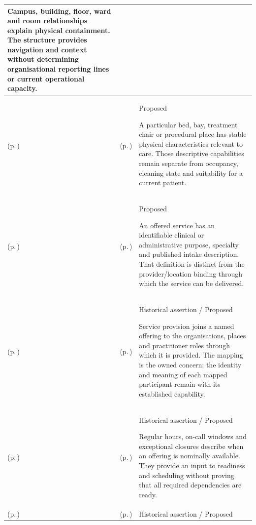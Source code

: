 \begin{longtable}{|>{\raggedright\arraybackslash}p{0.27\TableWidth}|>{\raggedright\arraybackslash}p{0.27\TableWidth}|>{\raggedright\arraybackslash}p{0.46\TableWidth}|}
Campus, building, floor, ward and room relationships explain physical containment. The structure provides navigation and context without determining organisational reporting lines or current operational capacity.\\\hline
\nameref{cap:bec-location-administration} (p.\,\pageref{cap:bec-location-administration}) & \nameref{cap:bec-care-place-definition} (p.\,\pageref{cap:bec-care-place-definition}) & Proposed

A particular bed, bay, treatment chair or procedural place has stable physical characteristics relevant to care. Those descriptive capabilities remain separate from occupancy, cleaning state and suitability for a current patient.\\\hline
\nameref{cap:bec-health-service-administration} (p.\,\pageref{cap:bec-health-service-administration}) & \nameref{cap:bec-healthcare-service-definition} (p.\,\pageref{cap:bec-healthcare-service-definition}) & Proposed

An offered service has an identifiable clinical or administrative purpose, specialty and published intake description. That definition is distinct from the provider/location binding through which the service can be delivered.\\\hline
\nameref{cap:bec-health-service-administration} (p.\,\pageref{cap:bec-health-service-administration}) & \nameref{cap:bec-service-provision-relationship} (p.\,\pageref{cap:bec-service-provision-relationship}) & Historical assertion / Proposed

Service provision joins a named offering to the organisations, places and practitioner roles through which it is provided. The mapping is the owned concern; the identity and meaning of each mapped participant remain with its established capability.\\\hline
\nameref{cap:bec-health-service-administration} (p.\,\pageref{cap:bec-health-service-administration}) & \nameref{cap:bec-service-availability-definition} (p.\,\pageref{cap:bec-service-availability-definition}) & Historical assertion / Proposed

Regular hours, on-call windows and exceptional closures describe when an offering is nominally available. They provide an input to readiness and scheduling without proving that all required dependencies are ready.\\\hline
\nameref{cap:bec-health-service-administration} (p.\,\pageref{cap:bec-health-service-administration}) & \nameref{cap:bec-service-eligibility-definition} (p.\,\pageref{cap:bec-service-eligibility-definition}) & Historical assertion / Proposed


\end{longtable}
